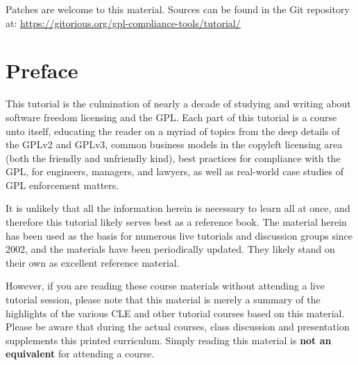 \documentclass[10pt, letterpaper, openany, oneside]{book}
\begin{document}
\begin{titlepage}
\begin{center}
{\vfill

Patches are welcome to this material.  Sources can be found in the Git
repository at: \url{https://gitorious.org/gpl-compliance-tools/tutorial/}
}
\end{center}

\end{titlepage}

\tableofcontents

\chapter{Preface}

This tutorial is the culmination of nearly a decade of studying and writing
about software freedom licensing and the GPL\@.  Each part of this tutorial
is a course unto itself, educating the reader on a myriad of topics from the
deep details of the GPLv2 and GPLv3, common business models in the copyleft
licensing area (both the friendly and unfriendly kind), best practices for
compliance with the GPL, for engineers, managers, and lawyers, as well as
real-world case studies of GPL enforcement matters.

It is unlikely that all the information herein is necessary to learn all at
once, and therefore this tutorial likely serves best as a reference book.
The material herein has been used as the basis for numerous live tutorials
and discussion groups since 2002, and the materials have been periodically
updated.   They likely stand on their own as excellent reference material.

However, if you are reading these course materials without attending a live
tutorial session, please note that this material is merely a summary of the
highlights of the various CLE and other tutorial courses based on this
material.  Please be aware that during the actual courses, class discussion
and presentation supplements this printed curriculum.  Simply reading this
material is \textbf{not an equivalent} for attending a course.

\mainmatter







\appendix


\end{document}
